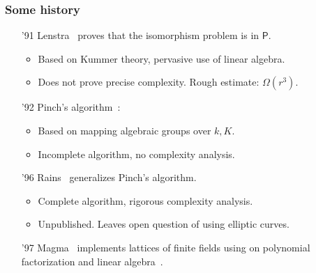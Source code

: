 \documentclass[francais]{beamer}
\begin{document}
\begin{frame}\frametitle{Some history}
    \begin{enumerate}
    \item['91] Lenstra~\cite{LenstraJr91} proves that the isomorphism
      problem is in $\mathsf{P}$.
      \begin{itemize}
      \item Based on Kummer theory, pervasive use of linear algebra.
      \item Does not prove precise complexity. Rough estimate:
        $\Omega(r^3)$.
      \end{itemize}
    \item['92] Pinch's algorithm~\cite{Pinch}:
      \begin{itemize}
      \item Based on mapping algebraic groups over $k,K$.
      \item Incomplete algorithm, no complexity analysis.
      \end{itemize}
    \item['96] Rains~\cite{rains2008} generalizes Pinch's algorithm.
      \begin{itemize}
      \item Complete algorithm, rigorous complexity analysis.
      \item Unpublished. Leaves open question of using elliptic
        curves.
      \end{itemize}
    \item['97] Magma~\cite{MAGMA} implements lattices of finite fields
      using on polynomial factorization and linear algebra~\cite{bosma+cannon+steel97}.
    \end{enumerate}
  \end{frame}
\end{document}
